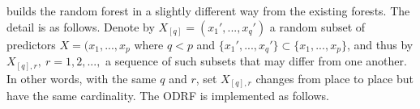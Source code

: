 \documentclass[nojss]{jss}
\numberwithin{equation}{section}
\DeclareMathOperator*{\argmax}{arg\,max}
\def\P{{\mathbf P}}
\def\S{{\cal S}}
\begin{document}
 builds the random forest in a slightly different way from the existing forests. The detail is as follows.
Denote by $ X_{[q]} = (x_1', ..., x_q')$ a random subset of predictors $ X  = (x_1, ..., x_p $ where $ q < p$ and $ \{x_1', ..., x_q'\} \subset \{x_1, ..., x_p\} $, and thus  by $X_{[q], r},\ r=1, 2, ...,$  a sequence of such subsets that may differ from one another.  In other words, with the same $ q $ and $ r$,  set $X_{[q], r}$ changes from place to place but have the same cardinality.
The ODRF is implemented as follows.
\end{document}

